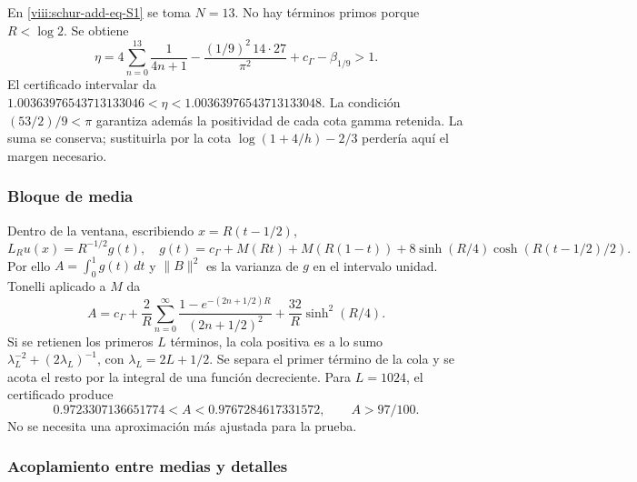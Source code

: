 En \eqref{viii:schur-add-eq-S1} se toma \(N=13\). No hay términos primos porque
\(R<\log2\). Se obtiene
\begin{equation}
\eta=4\sum_{n=0}^{13}\frac1{4n+1}
-\frac{(1/9)^2\,14\cdot27}{\pi^2}+c_\Gamma-\beta_{1/9}>1.
\label{viii:schur-add-eq-S9}
\end{equation}
El certificado intervalar da
\(1.00363976543713133046<\eta<1.00363976543713133048\).
La condición \((53/2)/9<\pi\) garantiza además la positividad de
cada cota gamma retenida. La suma se conserva; sustituirla por la
cota \(\log(1+4/h)-2/3\) perdería aquí el margen necesario.

\subsubsection{Bloque de media}
\label{viii:schur-add-sub-269}

Dentro de la ventana, escribiendo \(x=R(t-1/2)\),
\begin{equation}
L_Ru(x)=R^{-1/2}g(t),\quad
g(t)=c_\Gamma+M(Rt)+M(R(1-t))
+8\sinh(R/4)\cosh(R(t-1/2)/2).
\label{viii:schur-add-display-22}
\end{equation}
Por ello \(A=\int_0^1g(t)\,dt\) y \(\|B\|^2\) es la varianza
de \(g\) en el intervalo unidad. Tonelli aplicado a \(M\) da
\begin{equation}
A=c_\Gamma+\frac2R\sum_{n=0}^\infty
\frac{1-e^{-(2n+1/2)R}}{(2n+1/2)^2}
+\frac{32}R\sinh^2(R/4).
\label{viii:schur-add-eq-S10}
\end{equation}
Si se retienen los primeros \(L\) términos, la cola positiva es a lo
sumo \(\lambda_L^{-2}+(2\lambda_L)^{-1}\), con
\(\lambda_L=2L+1/2\). Se separa el primer término de la cola y se
acota el resto por la integral de una función decreciente. Para
\(L=1024\), el certificado produce
\begin{equation}
0.9723307136651774<A<0.9767284617331572,
\qquad A>97/100.
\label{viii:schur-add-eq-S11}
\end{equation}
No se necesita una aproximación más ajustada para la prueba.

\subsubsection{Acoplamiento entre medias y detalles}
\label{viii:schur-add-sub-295}

